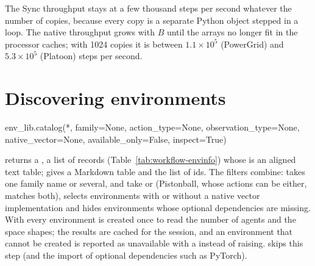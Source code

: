 The Sync throughput stays at a few thousand steps per second whatever the
number of copies, because every copy is a separate Python object stepped in a
loop. The native throughput grows with $B$ until the arrays no longer fit in
the processor caches; with 1024 copies it is between $1.1\times10^{5}$
(PowerGrid) and $5.3\times10^{5}$ (Platoon) steps per second.

\section{Discovering environments}\label{sec:workflow-catalog}

\begin{pycode}
env_lib.catalog(*, family=None, action_type=None, observation_type=None,
                native_vector=None, available_only=False, inspect=True)
\end{pycode}
returns a , a list of  records (Table~\ref{tab:workflow-envinfo})
whose  is an aligned text table;  gives a
Markdown table and  the list of ids. The filters combine:
 takes one family name or several,  and
 take  or 
(Pistonball, whose actions can be either, matches both), 
selects environments with or without a native vector implementation and
 hides environments whose optional dependencies are
missing. With  every environment is created once to read
the number of agents and the space shapes; the results are cached for the
session, and an environment that cannot be created is reported as unavailable
with a  instead of raising.  skips this step
(and the import of optional dependencies such as PyTorch).

